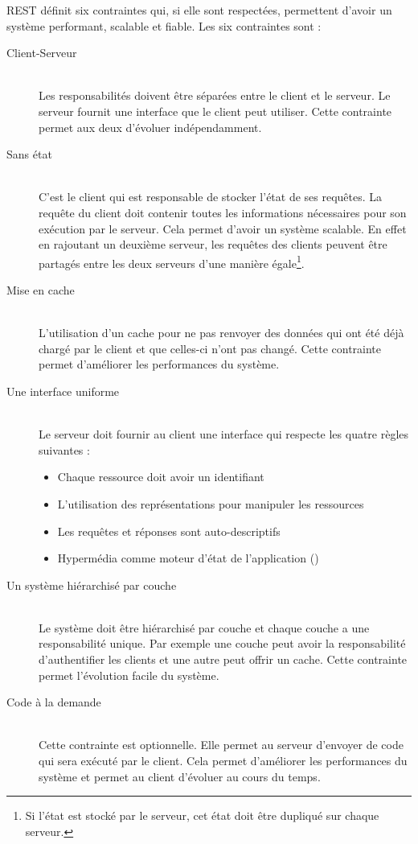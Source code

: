 REST définit six contraintes qui, si elle sont respectées, permettent d'avoir un système performant, scalable et fiable. Les six contraintes sont :

\begin{description}
\item[Client-Serveur]\hfill\\
Les responsabilités doivent être séparées entre le client et le serveur. Le serveur fournit une interface que le client peut utiliser. Cette contrainte permet aux deux d'évoluer indépendamment.

\item[Sans état]\hfill\\
C'est le client qui est responsable de stocker l'état de ses requêtes. La requête du client doit contenir toutes les informations nécessaires pour son exécution par le serveur. Cela permet d'avoir un système scalable. En effet en rajoutant un deuxième serveur, les requêtes des clients peuvent être partagés entre les deux serveurs d'une manière égale\footnote{Si l'état est stocké par le serveur, cet état doit être dupliqué sur chaque serveur.}.

\item[Mise en cache]\hfill\\
L'utilisation d'un cache pour ne pas renvoyer des données qui ont été déjà chargé par le client et que celles-ci n'ont pas changé. Cette contrainte permet d'améliorer les performances du système.

\item[Une interface uniforme]\hfill\\
Le serveur doit fournir au client une interface qui respecte les quatre règles suivantes :
\begin{itemize}
\item Chaque ressource doit avoir un identifiant
\item L'utilisation des représentations pour manipuler les ressources
\item Les requêtes et réponses sont auto-descriptifs
\item Hypermédia comme moteur d'état de l'application ()	 
\end{itemize} 

\item[Un système hiérarchisé par couche]\hfill\\
Le système doit être hiérarchisé par couche et chaque couche a une responsabilité unique. Par exemple une couche peut avoir la responsabilité d'authentifier les clients et une autre peut offrir un cache. Cette contrainte permet l'évolution facile du système.

\item[Code à la demande]\hfill\\
Cette contrainte est optionnelle. Elle permet au serveur d'envoyer de code qui sera exécuté par le client. Cela permet d'améliorer les performances du système et permet au client d'évoluer au cours du temps.
\end{description}

